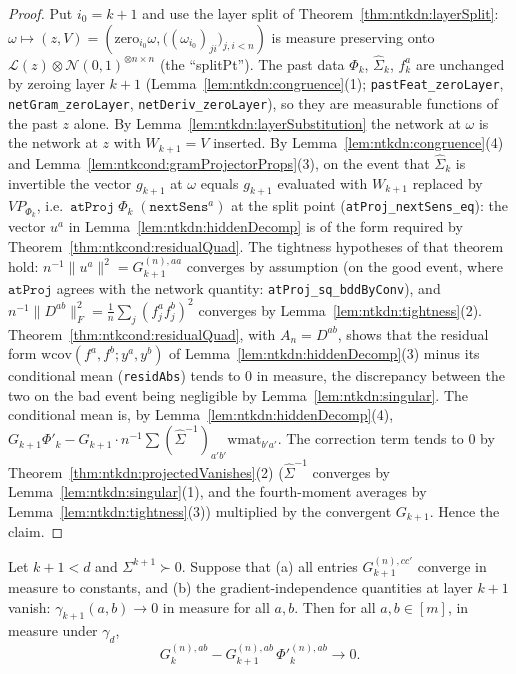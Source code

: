 \begin{proof}
  \leanok
Put $i_0=k+1$ and use the layer split of Theorem~\ref{thm:ntkdn:layerSplit}:
$\omega\mapsto(z,V)=(\mathrm{zero}_{i_0}\omega,
\bigl((\omega_{i_0})_{ji}\bigr)_{j,i<n})$ is measure preserving onto
$\mathcal L(z)\otimes\mathcal N(0,1)^{\otimes n\times n}$ (the ``splitPt'').
The past data $\Phi_k$, $\hat\Sigma_k$, $f_k^a$ are unchanged by zeroing layer $k+1$ (Lemma~\ref{lem:ntkdn:congruence}(1); \texttt{pastFeat\_zeroLayer}, \texttt{netGram\_zeroLayer}, \texttt{netDeriv\_zeroLayer}), so they are measurable functions of the past $z$ alone. By Lemma~\ref{lem:ntkdn:layerSubstitution} the network at $\omega$ is the network at $z$ with $W_{k+1}=V$ inserted. By Lemma~\ref{lem:ntkdn:congruence}(4) and Lemma~\ref{lem:ntkcond:gramProjectorProps}(3), on the event that $\hat\Sigma_k$ is invertible the vector $g_{k+1}$ at $\omega$ equals $g_{k+1}$ evaluated with $W_{k+1}$ replaced by $VP_{\Phi_k}$, i.e.\ $\texttt{atProj}\;\Phi_k\;(\texttt{nextSens}^a)$ at the split point (\texttt{atProj\_nextSens\_eq}): the vector $u^a$ in Lemma~\ref{lem:ntkdn:hiddenDecomp} is of the form required by Theorem~\ref{thm:ntkcond:residualQuad}.
The tightness hypotheses of that theorem hold: $n^{-1}\|u^a\|^2=G_{k+1}^{(n),aa}$ converges by assumption (on the good event, where $\texttt{atProj}$ agrees with the network quantity: \texttt{atProj\_sq\_bddByConv}), and $n^{-1}\|D^{ab}\|_F^2=\frac1n\sum_j(f_j^af_j^b)^2$ converges by Lemma~\ref{lem:ntkdn:tightness}(2). Theorem~\ref{thm:ntkcond:residualQuad}, with $A_n=D^{ab}$, shows that the residual form $\mathrm{wcov}(f^a,f^b;y^a,y^b)$ of Lemma~\ref{lem:ntkdn:hiddenDecomp}(3) minus its conditional mean (\texttt{residAbs}) tends to $0$ in measure, the discrepancy between the two on the bad event being negligible by Lemma~\ref{lem:ntkdn:singular}. The conditional mean is, by Lemma~\ref{lem:ntkdn:hiddenDecomp}(4), $G_{k+1}\Phi'_k-G_{k+1}\cdot n^{-1}\sum(\hat\Sigma^{-1})_{a'b'}\mathrm{wmat}_{b'a'}$. The correction term tends to $0$ by Theorem~\ref{thm:ntkdn:projectedVanishes}(2) ($\hat\Sigma^{-1}$ converges by Lemma~\ref{lem:ntkdn:singular}(1), and the fourth-moment averages by Lemma~\ref{lem:ntkdn:tightness}(3)) multiplied by the convergent $G_{k+1}$. Hence the claim.
\end{proof}

\begin{theorem}\label{thm:ntkdn:decoupling}
  \leanok
Let $k+1<d$ and $\Sigma^{k+1}\succ0$. Suppose that (a) all entries $G_{k+1}^{(n),cc'}$
converge in measure to constants, and (b) the gradient-independence quantities at layer $k+1$
vanish: $\gamma_{k+1}(a,b)\to0$ in measure for all $a,b$. Then for all $a,b\in[m]$, in
measure under $\gamma_d$,
\[
  G_k^{(n),ab}-G_{k+1}^{(n),ab}\,\Phi'^{(n),ab}_k\longrightarrow0 .
\]
\end{theorem}

